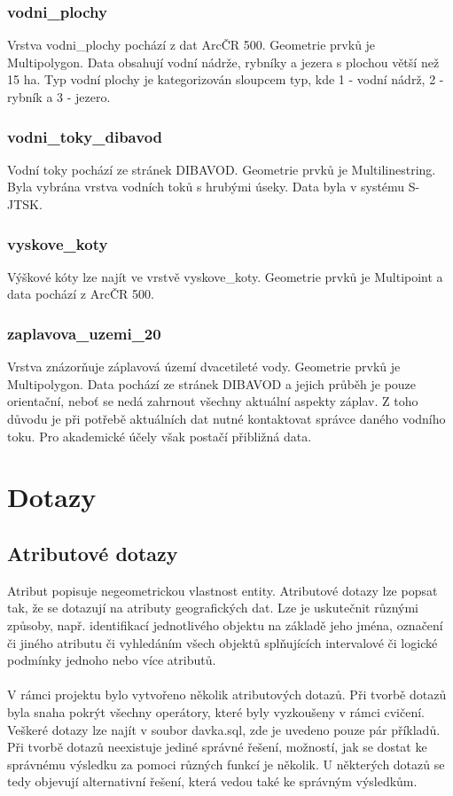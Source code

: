 \documentclass[a4paper, 12pt]{article}
\begin{document}
\subsubsection{vodni\_plochy}
Vrstva vodni\_plochy pochází z dat ArcČR 500. Geometrie prvků je Multipolygon. Data obsahují vodní nádrže, rybníky a jezera s plochou větší než 15 ha. Typ vodní plochy je kategorizován sloupcem typ, kde 1 - vodní nádrž, 2 - rybník a 3 - jezero. 

\subsubsection{vodni\_toky\_dibavod}
Vodní toky pochází ze stránek DIBAVOD. Geometrie prvků je Multilinestring. Byla vybrána vrstva vodních toků s hrubými úseky. Data byla v systému S-JTSK. 


\subsubsection{vyskove\_koty}
Výškové kóty lze najít ve vrstvě vyskove\_koty. Geometrie prvků je Multipoint a data pochází z ArcČR 500. 

\subsubsection{zaplavova\_uzemi\_20}
Vrstva znázorňuje záplavová území dvacetileté vody. Geometrie prvků je Multipolygon. Data pochází ze stránek DIBAVOD a jejich průběh je pouze orientační, neboť se nedá zahrnout všechny aktuální aspekty záplav. Z toho důvodu je při potřebě aktuálních dat nutné kontaktovat správce daného vodního toku. Pro akademické účely však postačí přibližná data.

\section{Dotazy}

\subsection{Atributové dotazy}
Atribut popisuje negeometrickou vlastnost entity. Atributové dotazy lze popsat tak, že se dotazují na atributy geografických dat. Lze je uskutečnit různými způsoby, např. identifikací jednotlivého objektu na základě jeho jména, označení či jiného atributu či vyhledáním všech objektů splňujících intervalové či logické podmínky jednoho nebo více atributů. \\
\\
V rámci projektu bylo vytvořeno několik atributových dotazů. Při tvorbě dotazů byla snaha pokrýt všechny operátory, které byly vyzkoušeny v rámci cvičení. Veškeré dotazy lze najít v soubor davka.sql, zde je uvedeno pouze pár příkladů. Při tvorbě dotazů neexistuje jediné správné řešení, možností, jak se dostat ke správnému výsledku za pomoci různých funkcí je několik. U některých dotazů se tedy objevují alternativní řešení, která vedou také ke správným výsledkům. \\
\\
\end{document}
